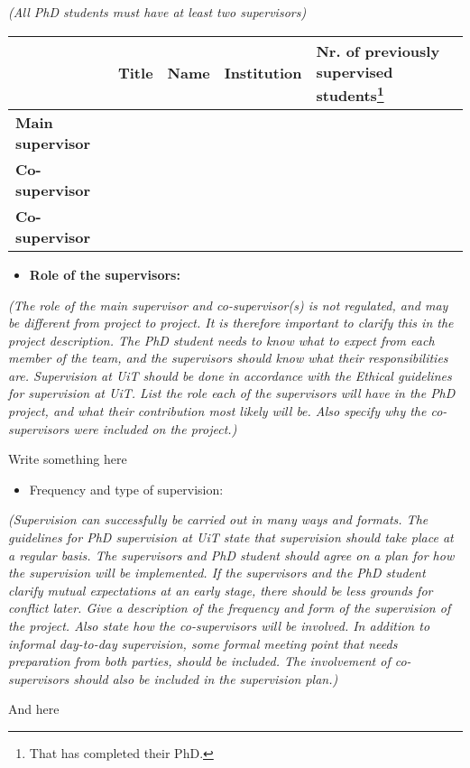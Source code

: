 %
%
\textit{(All PhD students must have at least two supervisors)}

%
%
\begin{tabularx}{\textwidth}{|X|X|l|X|X|}
    \hline
    & \textbf{Title} & \textbf{Name} & \textbf{Institution} & \textbf{Nr. of previously supervised students}\footnote{That has completed their PhD.} \\
    \hline
    \textbf{Main supervisor} & & & & \\
    \hline 
    \textbf{Co-supervisor} & & & & \\
    \hline 
    \textbf{Co-supervisor} & & & & \\
    \hline
\end{tabularx}
\vspace{1cm}

\begin{itemize}
    \item \textbf{Role of the supervisors: }
\end{itemize}
\textit{(The role of the main supervisor and co-supervisor(s) is not regulated, and may be different from project to project. It is therefore important to clarify this in the project description. The PhD student needs to know what to expect from each member of the team, and the supervisors should know what their responsibilities are. Supervision at UiT should be done in accordance with the Ethical guidelines for supervision at UiT. List the role each of the supervisors will have in the PhD project, and what their contribution most likely will be. Also specify why the co-supervisors were included on the project.)}



Write something here




\begin{itemize}
    \item Frequency and type of supervision: 
\end{itemize}

\textit{(Supervision can successfully be carried out in many ways and formats. The guidelines for PhD supervision at UiT state that supervision should take place at a regular basis. The supervisors and PhD student should agree on a plan for how the supervision will be implemented. If the supervisors and the PhD student clarify mutual expectations at an early stage, there should be less grounds for conflict later. Give a description of the frequency and form of the supervision of the project. Also state how the co-supervisors will be involved. In addition to informal day-to-day supervision, some formal meeting point that needs preparation from both parties, should be included. The involvement of co-supervisors should also be included in the supervision plan.)}



And here